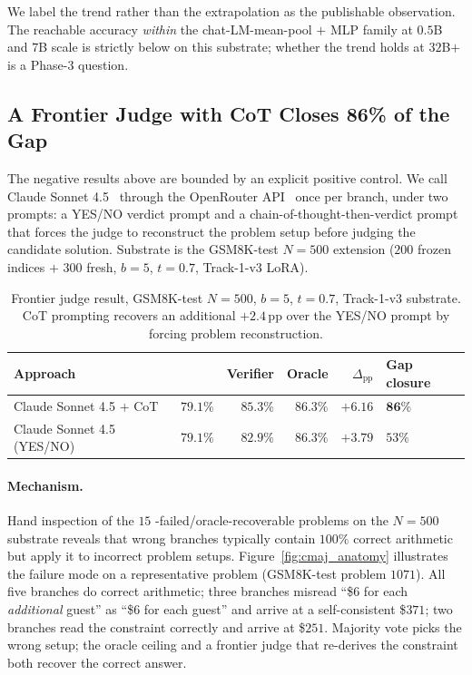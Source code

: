 We label the trend rather than the extrapolation as the publishable
observation.  The reachable accuracy \emph{within} the
chat-LM-mean-pool $+$ MLP family at $0.5$B and $7$B scale is
strictly below \cmaj{} on this substrate; whether the trend holds at
$32$B$+$ is a Phase-3 question.

\subsection{A Frontier Judge with CoT Closes 86\% of the Gap}
\label{subsec:frontier_judge}

The negative results above are bounded by an explicit positive
control.  We call Claude Sonnet 4.5~\citep{anthropic2025sonnet}
through the OpenRouter API~\citep{openrouter2024} once per branch,
under two prompts: a YES/NO verdict prompt and a
chain-of-thought-then-verdict prompt that forces the judge to
reconstruct the problem setup before judging the candidate solution.
Substrate is the GSM8K-test $N{=}500$ extension ($200$ frozen indices
$+$ $300$ fresh, $b{=}5$, $t{=}0.7$, Track-1-v3 LoRA).

\begin{table}[h]
\centering
\caption{Frontier judge result, GSM8K-test $N{=}500$, $b{=}5$,
$t{=}0.7$, Track-1-v3 substrate.  CoT prompting recovers an
additional $+2.4$\,pp over the YES/NO prompt by forcing problem
reconstruction.}
\label{tab:frontier_judge}
\smallskip
\small
\begin{tabular}{lrrrrl}
\toprule
Approach & \cmaj{} & Verifier & Oracle & $\Delta_\text{pp}$ & Gap closure \\
\midrule
Claude Sonnet 4.5 $+$ CoT & $79.1\%$ & $\mathbf{85.3\%}$ & $86.3\%$ & $\mathbf{+6.16}$ & $\mathbf{86\%}$ \\
Claude Sonnet 4.5 (YES/NO) & $79.1\%$ & $82.9\%$ & $86.3\%$ & $+3.79$ & $53\%$ \\
\bottomrule
\end{tabular}
\normalsize
\end{table}

\paragraph{Mechanism.}
Hand inspection of the $15$ \cmaj{}-failed/oracle-recoverable
problems on the $N{=}500$ substrate reveals that wrong branches
typically contain $100\%$ correct arithmetic but apply it to
incorrect problem setups.  Figure~\ref{fig:cmaj_anatomy}
illustrates the failure mode on a representative problem
(GSM8K-test problem $1071$).  All five branches do correct
arithmetic; three branches misread ``\$6 for each \emph{additional}
guest'' as ``\$6 for each guest'' and arrive at a self-consistent
\$$371$; two branches read the constraint correctly and arrive
at \$$251$.  Majority vote picks the wrong setup; the oracle
ceiling and a frontier judge that re-derives the constraint both
recover the correct answer.

